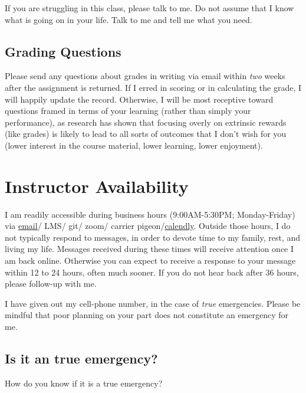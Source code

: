 If you are struggling in this class, please talk to me. Do not assume that I know what is going on in your life. Talk to me and tell me what you need.

\hypertarget{grading-questions}{%
\subsection{Grading Questions}\label{grading-questions}}

Please send any questions about grades in writing via email within \emph{two} weeks after the assignment is returned. If I erred in scoring or in calculating the grade, I will happily update the record. Otherwise, I will be most receptive toward questions framed in terms of your learning (rather than simply your performance), as research has shown that focusing overly on extrinsic rewards (like grades) is likely to lead to all sorts of outcomes that I don't wish for you (lower interest in the course material, lower learning, lower enjoyment).

\hypertarget{instructor-availability}{%
\section{Instructor Availability}\label{instructor-availability}}

I am readily accessible during business hours (9:00AM-5:30PM; Monday-Friday) via \href{garrissm@wfu.edu}{email}/ LMS/ git/ zoom/ carrier pigeon/\href{https://calendly.com/smasongarrison/}{calendly}. Outside those hours, I do not typically respond to messages, in order to devote time to my family, rest, and living my life. Messages received during these times will receive attention once I am back online. Otherwise you can expect to receive a response to your message within 12 to 24 hours, often much sooner. If you do not hear back after 36 hours, please follow-up with me.

I have given out my cell-phone number, in the case of \emph{true} emergencies. Please be mindful that poor planning on your part does not constitute an emergency for me.

\hypertarget{is-it-an-true-emergency}{%
\subsection{Is it an true emergency?}\label{is-it-an-true-emergency}}

How do you know if it is a true emergency?

